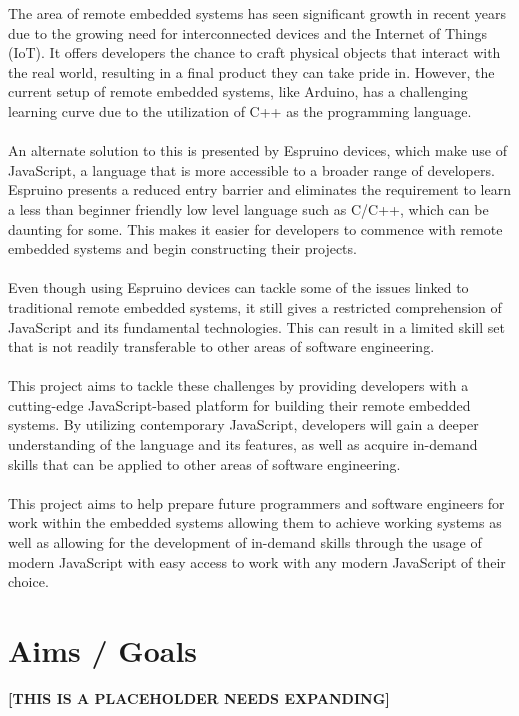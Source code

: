 \documentclass{l4proj}
\begin{document}
\text 
The area of remote embedded systems has seen significant growth in recent years due to the growing need for interconnected devices and the Internet of Things (IoT). It offers developers the chance to craft physical objects that interact with the real world, resulting in a final product they can take pride in. However, the current setup of remote embedded systems, like Arduino, has a challenging learning curve due to the utilization of C++ as the programming language.
\\ \\
An alternate solution to this is presented by Espruino devices, which make use of JavaScript, a language that is more accessible to a broader range of developers. Espruino presents a reduced entry barrier and eliminates the requirement to learn a less than beginner friendly low level language such as C/C++, which can be daunting for some. This makes it easier for developers to commence with remote embedded systems and begin constructing their projects.
\\ \\
Even though using Espruino devices can tackle some of the issues linked to traditional remote embedded systems, it still gives a restricted comprehension of JavaScript and its fundamental technologies. This can result in a limited skill set that is not readily transferable to other areas of software engineering.
\\ \\
This project aims to tackle these challenges by providing developers with a cutting-edge JavaScript-based platform for building their remote embedded systems. By utilizing contemporary JavaScript, developers will gain a deeper understanding of the language and its features, as well as acquire in-demand skills that can be applied to other areas of software engineering.
\\ \\
This project aims to help prepare future programmers and software engineers for work within the embedded systems allowing them to achieve working systems as well as allowing for the development of in-demand skills through the usage of modern JavaScript with easy access to work with any modern JavaScript of their choice.

\section{Aims / Goals}

\textbf{[THIS IS A PLACEHOLDER NEEDS EXPANDING]}
\end{document}
